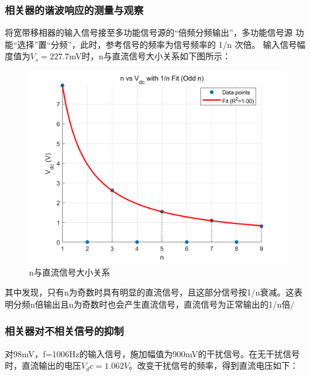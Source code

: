 \documentclass[12pt,a4paper]{article}
\begin{document}
\subsubsection{相关器的谐波响应的测量与观察}
将宽带移相器的输入信号接至多功能信号源的“倍频分频输出”，多功能信号源
功能“选择”置“分频”，此时，参考信号的频率为信号频率的 1/n 次倍。
输入信号幅度值为$V_s=227.7$mV时，n与直流信号大小关系如下图所示：
\begin{figure}[H]
    \centering
    \includegraphics[width=\textwidth]{n_vs_Vdc_fit_odd.png}
    \caption{n与直流信号大小关系}
    \label{fig:n-vs-Vdc-fit-odd}
    \end{figure}
其中发现，只有n为奇数时具有明显的直流信号，且这部分信号按1/n衰减。这表明分频n倍输出且n为奇数时也会产生直流信号，直流信号为正常输出的1/n倍/
\subsubsection{相关器对不相关信号的抑制}
对98mV，f=1006Hz的输入信号，施加幅值为900mV的干扰信号。在无干扰信号时，直流输出的电压$V_dc=1.062V$。改变干扰信号的频率，得到直流电压如下：
\end{document}
